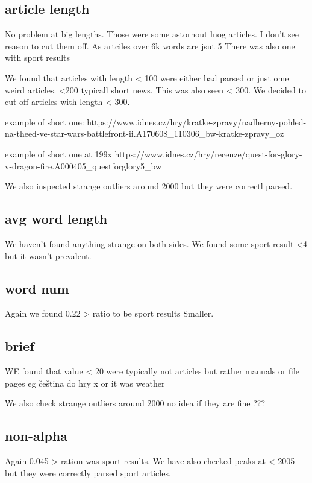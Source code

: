\documentclass{article}
\begin{document}
    \subsection{article length}
    No problem at big lengths. Those were some astornout lnog articles. I don't see reason to cut them off. As artciles over 6k words are jsut 5%
    There was also one with sport results

    We found that articles with length < 100 were either bad parsed or just ome weird articles. <200 typicall short news.
    This was also seen < 300. We decided to cut off articles with length < 300.

    example of short one: https://www.idnes.cz/hry/kratke-zpravy/nadherny-pohled-na-theed-ve-star-wars-battlefront-ii.A170608_110306_bw-kratke-zpravy_oz

    example of short one at 199x https://www.idnes.cz/hry/recenze/quest-for-glory-v-dragon-fire.A000405_questforglory5_bw


    We also inspected strange outliers around 2000 but they were correctl parsed.



    \subsection{avg word length}
    We haven't found anything strange on both sides. We found some sport result <4 but it wasn't prevalent.

    \subsection{word num}
    Again we found 0.22 > ratio to be sport results Smaller.
    



    \subsection{brief}
        WE found that value < 20 were typically not articles but rather manuals or file pages eg čeština do hry x or it was weather

        We also check strange outliers around 2000 no idea if they are fine ???


    \subsection{non-alpha}
    Again 0.045 > ration was sport results. We have also checked peaks at < 2005 but they were correctly parsed sport articles.
\end{document}
